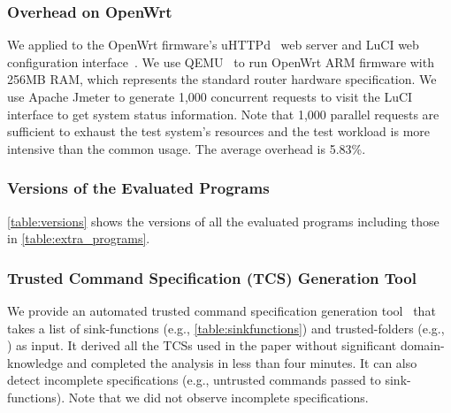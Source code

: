 % 

\subsubsection{Overhead on OpenWrt}
\label{appendix:embedded_devices_perf}
We applied \sysname to the OpenWrt firmware's uHTTPd~\cite{uHTTPd} web server and LuCI web configuration interface~\cite{LuCI}.
We use QEMU~\cite{QEMU} to run OpenWrt ARM firmware with 256MB RAM, which represents the standard router hardware specification. 
%
We use Apache Jmeter to generate 1,000 concurrent requests to visit the LuCI interface to get system status information. 
Note that 1,000 parallel requests are sufficient to exhaust the test system's resources and the test workload is more intensive than the common usage.
%
The average overhead is 5.83\%.

\subsubsection{Versions of the Evaluated Programs}
\label{appendix:versions}
\autoref{table:versions} shows the versions of all the evaluated programs including those in \autoref{table:extra_programs}.




\subsubsection{Trusted Command Specification (TCS) Generation Tool}
\label{appendix:tcstool}
We provide an automated trusted command specification generation tool~\cite{csr-tool} that takes a list of sink-functions (e.g., \autoref{table:sinkfunctions}) and trusted-folders (e.g., ) as input. It derived all the TCSs used in the paper without significant domain-knowledge and completed the analysis in less than four minutes. 
It can also detect incomplete specifications (e.g., untrusted commands passed to sink-functions). Note that we did not observe incomplete specifications.

